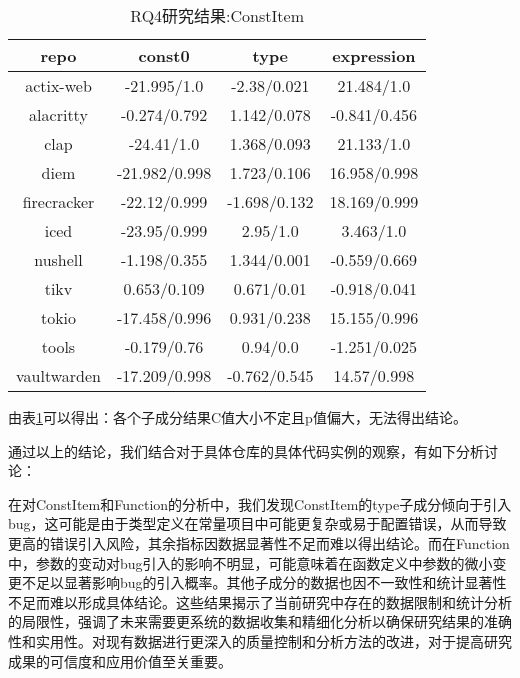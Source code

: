\begin{table}[ht]
	\centering
	\caption{RQ4研究结果:ConstItem}
	\begin{tabular}{cccc}
        \toprule
		\textbf{repo}        & \textbf{const0}        & \textbf{type}         & \textbf{expression}   \\
        \midrule
		actix-web   & \cellcolor{gray!20}-21.995/1.0   & \cellcolor{orange!30}-2.38/0.021  & \cellcolor{gray!20}21.484/1.0   \\
		alacritty   & \cellcolor{gray!20}-0.274/0.792  & \cellcolor{gray!20}1.142/0.078  & \cellcolor{gray!20}-0.841/0.456 \\
		clap        & \cellcolor{gray!20}-24.41/1.0    & \cellcolor{gray!20}1.368/0.093  & \cellcolor{gray!20}21.133/1.0   \\
		diem        & \cellcolor{gray!20}-21.982/0.998 & \cellcolor{gray!20}1.723/0.106  & \cellcolor{gray!20}16.958/0.998 \\
		firecracker & \cellcolor{gray!20}-22.12/0.999  & \cellcolor{gray!20}-1.698/0.132 & \cellcolor{gray!20}18.169/0.999 \\
		iced        & \cellcolor{gray!20}-23.95/0.999  & \cellcolor{gray!20}2.95/1.0     & \cellcolor{gray!20}3.463/1.0    \\
		nushell     & \cellcolor{gray!20}-1.198/0.355  & \cellcolor{gray!20}1.344/0.001  & \cellcolor{gray!20}-0.559/0.669 \\
		tikv        & \cellcolor{gray!20}0.653/0.109   & \cellcolor{gray!20}0.671/0.01   & \cellcolor{gray!20}-0.918/0.041 \\
		tokio       & \cellcolor{gray!20}-17.458/0.996 & \cellcolor{gray!20}0.931/0.238  & \cellcolor{gray!20}15.155/0.996 \\
		tools       & \cellcolor{gray!20}-0.179/0.76   & \cellcolor{gray!20}0.94/0.0     & \cellcolor{gray!20}-1.251/0.025 \\
		vaultwarden & \cellcolor{gray!20}-17.209/0.998 & \cellcolor{gray!20}-0.762/0.545 & \cellcolor{gray!20}14.57/0.998   \\
        \bottomrule 
	\end{tabular} 
	\label{tab:RQ4-4}
\end{table}

由表\ref{tab:RQ4-4}可以得出：各个子成分结果C值大小不定且p值偏大，无法得出结论。

通过以上的结论，我们结合对于具体仓库的具体代码实例的观察，有如下分析讨论：

在对ConstItem和Function的分析中，我们发现ConstItem的type子成分倾向于引入bug，这可能是由于类型定义在常量项目中可能更复杂或易于配置错误，从而导致更高的错误引入风险，其余指标因数据显著性不足而难以得出结论。而在Function中，参数的变动对bug引入的影响不明显，可能意味着在函数定义中参数的微小变更不足以显著影响bug的引入概率。其他子成分的数据也因不一致性和统计显著性不足而难以形成具体结论。这些结果揭示了当前研究中存在的数据限制和统计分析的局限性，强调了未来需要更系统的数据收集和精细化分析以确保研究结果的准确性和实用性。对现有数据进行更深入的质量控制和分析方法的改进，对于提高研究成果的可信度和应用价值至关重要。